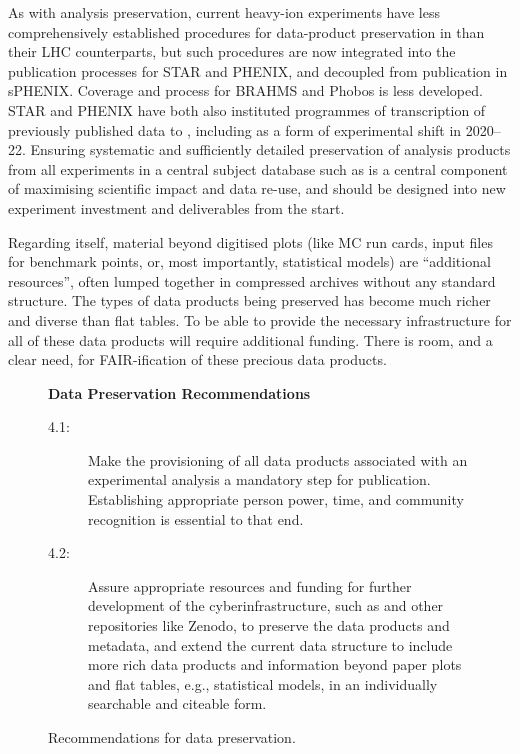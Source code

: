 \documentclass[11pt]{article}
\begin{document}
As with \gls{analysis preservation}, current heavy-ion experiments have less comprehensively established procedures for data-product preservation in \hepdata than their \gls{LHC} counterparts, but such procedures are now integrated into the publication processes for \gls{STAR} and \gls{PHENIX}, and decoupled from publication in \gls{sPHENIX}. Coverage and process for BRAHMS and Phobos is less developed. \gls{STAR} and \gls{PHENIX} have both also instituted programmes of transcription of previously published data to \hepdata, including as a form of experimental shift in 2020--22. Ensuring systematic and sufficiently detailed preservation of analysis products from all experiments in a central subject database such as \hepdata is a central component of maximising scientific impact and data re-use, and should be designed into new experiment investment and deliverables from the start. 

Regarding \hepdata itself, material beyond digitised plots (like MC run cards, input files for benchmark points, or, most importantly, statistical models) are ``additional resources'', often lumped together in compressed archives without any standard structure.
The types of data products being preserved has become much richer and diverse than flat tables.
To be able to provide the necessary infrastructure for all of these data products will require additional funding.
There is room, and a clear need, for \gls{FAIR}-ification of these precious data products. 

\begin{figure}[!ht]
\begin{tcolorbox}
\begin{center}
{\large \textbf{Data Preservation Recommendations}}
\end{center}
%
\begin{description}
   \item[4.1:] Make the provisioning of all \glspl{data product} associated with an experimental analysis a mandatory step for publication.
   Establishing appropriate person power, time, and community recognition is essential to that end.
   \item[4.2:] Assure appropriate resources and funding for further development of the cyberinfrastructure, such as \hepdata and other repositories like Zenodo, to preserve the data products and metadata, and extend the current data structure to include more rich data products and information beyond paper plots and flat tables, e.g., statistical models, in an individually searchable and citeable form.
\end{description}
\end{tcolorbox}
\caption{Recommendations for data preservation.}
\label{fig:recs_datapreservation}
\end{figure}
\end{document}

